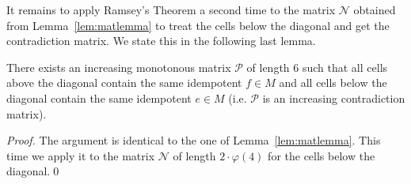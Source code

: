 \documentclass[envcountsame]{llncs}
\newcommand\mnat{\ensuremath{\mathscr{N}}\xspace}
\newcommand\pat{\ensuremath{\mathscr{P}}\xspace}
\begin{document}
It remains to apply Ramsey's Theorem a second time to the matrix \mnat
obtained from Lemma~\ref{lem:matlemma} to treat the cells below the
diagonal and get the contradiction matrix. We state this in the
following last lemma.


\begin{lemma}
  There exists an increasing monotonous matrix \pat of length $6$ such
  that all cells above the diagonal contain the same idempotent $f \in
  M$ and all cells below the diagonal contain the same idempotent $e \in
  M$ (i.e. \pat is an increasing contradiction matrix). 
\end{lemma}

\begin{proof}
  The argument is identical to the one of Lemma~\ref{lem:matlemma}. This
  time we apply it to the matrix \mnat of length $2 \cdot \varphi(4)$ for the
  cells below the diagonal.\qed
\end{proof}
\end{document}
